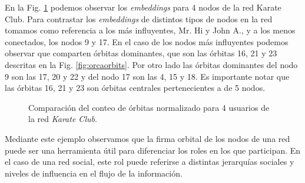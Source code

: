 En la Fig. \ref{fig:karateorbits} podemos observar los \textit{embeddings} para 4 nodos de la red Karate Club. Para contrastar los \textit{embeddings} de distintos tipos de nodos en la red tomamos como referencia a los más influyentes, Mr. Hi y John A., y a los menos conectados, los nodos 9 y 17. En el caso de los nodos más influyentes podemos observar que comparten órbitas dominantes, que son las órbitas 16, 21 y 23 descritas en la Fig. \ref{fig:orcaorbits}. Por otro lado las órbitas dominantes del nodo 9 son las 17, 20 y 22 y del nodo 17 son las 4, 15 y 18. Es importante notar que las órbitas 16, 21 y 23 son órbitas centrales pertenecientes a \graphlets de 5 nodos.

 \begin{figure}[htbp]
   \centering
   
    \caption{Comparación del conteo de órbitas normalizado para 4 usuarios de la red \textit{Karate Club}.}
    \label{fig:karateorbits}
\end{figure}

Mediante este ejemplo observamos que la firma orbital de los nodos de una red puede ser una herramienta útil para diferenciar los roles en los que participan. En el caso de una red social, este rol puede referirse a distintas jerarquías sociales y niveles de influencia en el flujo de la información.